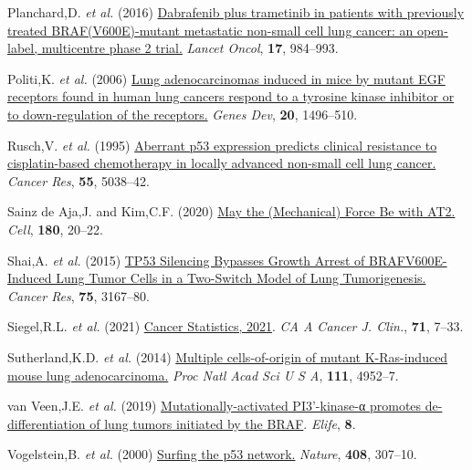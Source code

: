 \begin{CSLReferences}{1}{0}
\leavevmode{}%
Planchard,D. \emph{et al.} (2016) \href{https://doi.org/10.1016/s1470-2045(16)30146-2}{Dabrafenib plus trametinib in patients with previously treated BRAF(V600E)-mutant metastatic non-small cell lung cancer: an open-label, multicentre phase 2 trial.} \emph{Lancet Oncol}, \textbf{17}, 984--993.

\leavevmode{}%
Politi,K. \emph{et al.} (2006) \href{https://doi.org/10.1101/gad.1417406}{Lung adenocarcinomas induced in mice by mutant EGF receptors found in human lung cancers respond to a tyrosine kinase inhibitor or to down-regulation of the receptors.} \emph{Genes Dev}, \textbf{20}, 1496--510.

\leavevmode{}%
Rusch,V. \emph{et al.} (1995) \href{https://www.ncbi.nlm.nih.gov/pubmed/7585548}{Aberrant p53 expression predicts clinical resistance to cisplatin-based chemotherapy in locally advanced non-small cell lung cancer.} \emph{Cancer Res}, \textbf{55}, 5038--42.

\leavevmode{}%
Sainz de Aja,J. and Kim,C.F. (2020) \href{https://doi.org/10.1016/j.cell.2019.12.020}{May the (Mechanical) Force Be with AT2.} \emph{Cell}, \textbf{180}, 20--22.

\leavevmode{}%
Shai,A. \emph{et al.} (2015) \href{https://doi.org/10.1158/0008-5472.can-14-3701}{TP53 Silencing Bypasses Growth Arrest of BRAFV600E-Induced Lung Tumor Cells in a Two-Switch Model of Lung Tumorigenesis.} \emph{Cancer Res}, \textbf{75}, 3167--80.

\leavevmode{}%
Siegel,R.L. \emph{et al.} (2021) \href{https://doi.org/10.3322/caac.21654}{Cancer Statistics, 2021}. \emph{CA A Cancer J. Clin.}, \textbf{71}, 7--33.

\leavevmode{}%
Sutherland,K.D. \emph{et al.} (2014) \href{https://doi.org/10.1073/pnas.1319963111}{Multiple cells-of-origin of mutant K-Ras-induced mouse lung adenocarcinoma.} \emph{Proc Natl Acad Sci U S A}, \textbf{111}, 4952--7.

\leavevmode{}%
van Veen,J.E. \emph{et al.} (2019) \href{https://doi.org/10.7554/elife.43668}{Mutationally-activated PI3'-kinase-α promotes de-differentiation of lung tumors initiated by the BRAF}. \emph{Elife}, \textbf{8}.

\leavevmode{}%
Vogelstein,B. \emph{et al.} (2000) \href{https://doi.org/10.1038/35042675}{Surfing the p53 network.} \emph{Nature}, \textbf{408}, 307--10.


\end{CSLReferences}
